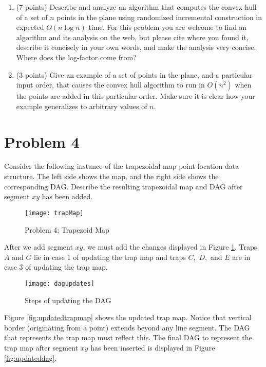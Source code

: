 \documentclass[11pt]{article}
\begin{document}
\begin{enumerate}

    \item (7 points) Describe and analyze an algorithm that computes the
        convex hull of a set of $n$ points in the plane using randomized
        incremental construction in expected $O(n \log n)$ time. For this
        problem you are welcome to find an algorithm and its analysis on the
        web, but please cite where you found it, describe it concisely in
        your own words, and make the analysis very concise. Where does the
        log-factor come from?

    \item (3 points) Give an example of a set of points in the plane, and a
        particular input order, that causes the convex hull algorithm to run in
        $O(n^2)$ when the points are added in this particular order. Make sure it
        is clear how your example generalizes to arbitrary values of $n$.

\end{enumerate}
\answer

\newpage
\section*{Problem 4}

Consider the following instance of the trapezoidal map point location data
structure. The left side shows the map, and the right side shows the
corresponding DAG. Describe the resulting trapezoidal map and DAG after segment
$xy$ has been added.

\begin{figure}[h]
    \centering
    \texttt{[image: trapMap]}
    \caption{Problem 4: Trapezoid Map}
\end{figure}
\answer
After we add segment $xy$, we must add the changes displayed in Figure \ref{fig:dagupdates}.
Traps $A$ and $G$ lie in case 1 of updating the trap map and traps $C,$ $D,$ and $E$ are in case 3 of updating the trap map.

\begin{figure}[h]
    \centering
    \texttt{[image: dagupdates]}
    \caption{Steps of updating the DAG}
    \label{fig:dagupdates}
\end{figure}

\newpage
Figure \ref{fig:updatedtrapmap} shows the updated trap map.
Notice that vertical border (originating from a point) extends beyond any line segment.
The DAG that represents the trap map must reflect this.
The final DAG to represent the trap map after segment $xy$ has been inserted is displayed in Figure \ref{fig:updateddag}.
\end{document}
